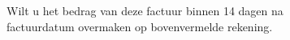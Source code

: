 \documentclass{factuur}
\begin{document}



\vfill
\begin{center}
	Wilt u het bedrag van deze factuur binnen 14 dagen na\\
	factuurdatum overmaken op bovenvermelde rekening.
\end{center}
\end{document}
